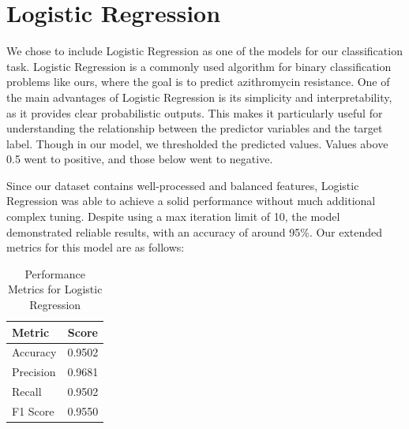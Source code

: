 \documentclass[manuscript,screen,review, nonacm]{acmart}
\begin{document}
  \section*{Logistic Regression}


  We chose to include Logistic Regression as one of the models for our classification task. 
  Logistic Regression is a commonly used algorithm for binary classification problems like 
  ours, where the goal is to predict azithromycin resistance. One of the main advantages of 
  Logistic Regression is its simplicity and interpretability, as it provides clear 
  probabilistic outputs. This makes it particularly useful for understanding the 
  relationship between the predictor variables and the target label. Though in our model,
  we thresholded the predicted values. Values above 0.5 went to positive, and those below went
  to negative.

  Since our dataset contains well-processed and balanced features, 
  Logistic Regression was able to achieve a solid performance without much additional 
  complex tuning. Despite using a max iteration limit of 10, the model demonstrated reliable 
  results, with an accuracy of around 95\%. Our extended metrics for this model are as follows:

  \begin{table}[H]
    \centering
    \begin{tabular}{@{}lc@{}}
        \toprule
        \textbf{Metric} & \textbf{Score} \\ \midrule
        Accuracy  & 0.9502 \\
        Precision & 0.9681 \\
        Recall    & 0.9502 \\
        F1 Score  & 0.9550 \\ \bottomrule
    \end{tabular}
    \caption{Performance Metrics for Logistic Regression}

\end{table}
  
\end{document}

